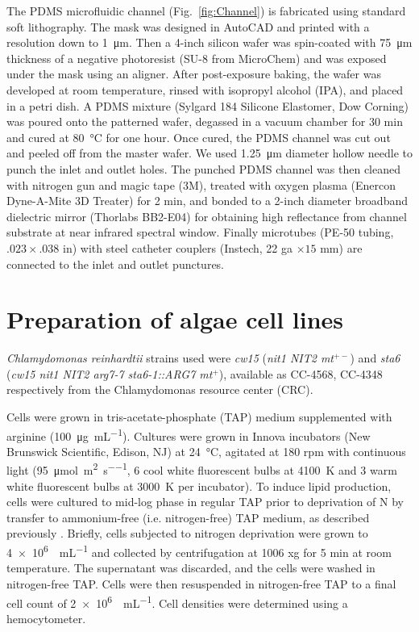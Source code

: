 \documentclass[aps,pra,reprint,longbibliography,groupedaddress]{revtex4-1}
\begin{document}
The PDMS microfluidic channel (Fig.~\ref{fig:Channel}) is fabricated using standard soft lithography. The mask was designed in AutoCAD and printed with a resolution down to \SI{1}{\micro\meter}. Then a 4-inch silicon wafer was spin-coated with \SI{75}{\micro\meter} thickness of a negative photoresist (SU-8 from MicroChem) and was exposed under the mask using an aligner. After post-exposure baking, the wafer was developed at room temperature, rinsed with isopropyl alcohol (IPA), and placed in a petri dish. A PDMS mixture (Sylgard 184 Silicone Elastomer, Dow Corning) was poured onto the patterned wafer, degassed in a vacuum chamber for 30 min and cured at \SI{80}{\degreeCelsius} for one hour. Once cured, the PDMS channel was cut out and peeled off from the master wafer. We used \SI{1.25}{\micro\meter} diameter hollow needle to punch the inlet and outlet holes. 
The punched PDMS channel was then cleaned with nitrogen gun and magic tape (3M), treated with oxygen plasma (Enercon Dyne-A-Mite 3D Treater) for 2 min, and bonded to a 2-inch diameter broadband dielectric mirror (Thorlabs BB2-E04) for obtaining high reflectance from channel substrate at near infrared spectral window. Finally microtubes (PE-50 tubing, $.023 \times .038$ in) with steel catheter couplers (Instech, 22 ga $\times 15$ mm) are connected to the inlet and outlet punctures.


\section*{Preparation of algae cell lines}

\textit{Chlamydomonas reinhardtii} strains used were \textit{cw15} (\textit{nit1 NIT2 mt$^{+-}$}) and \textit{sta6} (\textit{cw15 nit1 NIT2 arg7-7 sta6-1::ARG7 mt$^+$}), available as CC-4568, CC-4348 respectively from the Chlamydomonas resource center (CRC)\cite{minnesota2015chlamydomonas}.

Cells were grown in tris-acetate-phosphate (TAP) medium supplemented with arginine (\SI{100}{\micro\gram\per\milli\liter}). Cultures were grown in Innova incubators (New Brunswick Scientific, Edison, NJ) at \SI{24}{\degreeCelsius}, agitated at 180 rpm with continuous light (\SI{95}{\micro\mole\per\square\meter\per\second}, 6 cool white fluorescent bulbs at \SI{4100}{\kelvin} and 3 warm white fluorescent bulbs at \SI{3000}{\kelvin} per incubator). To induce lipid production, cells were cultured to mid-log phase in regular TAP prior to deprivation of N by transfer to ammonium-free (i.e. nitrogen-free) TAP medium, as described previously \cite{blaby2013systems}. Briefly, cells subjected to nitrogen deprivation were grown to \SI{4e6}{\cells\per\milli\liter} and collected by centrifugation at 1006 xg for 5 min at room temperature. The supernatant was discarded, and the cells were washed in nitrogen-free TAP. Cells were then resuspended in nitrogen-free TAP to a final cell count of \SI{2e6}{\cells\per\milli\liter}. Cell densities were determined using a hemocytometer.
\end{document}
